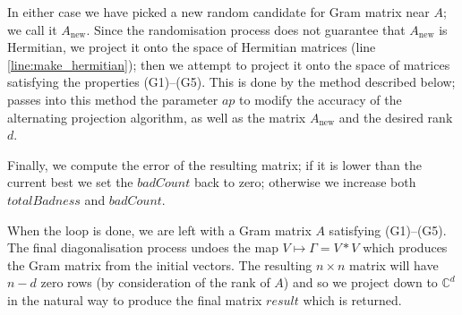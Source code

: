 \documentclass{article}
\newcommand{\C}{\mathbb{C}}
\theoremstyle{definition}
\begin{document}
  In either case we have picked a new random candidate for Gram matrix near $ A $; we call it $ A_\mathrm{new} $.
  Since the randomisation process does not guarantee that $ A_\mathrm{new} $ is Hermitian, we project it onto
  the space of Hermitian matrices (line \ref{line:make_hermitian}); then we attempt to project it onto the space
  of matrices satisfying the properties (G1)--(G5). This is done by the method 
  described below;  passes into this method the parameter $ ap $ to modify the accuracy
  of the alternating projection algorithm, as well as the matrix $ A_\mathrm{new} $ and the desired rank $ d $.

  Finally, we compute the error of the resulting matrix; if it is lower than the current best we set the $ badCount $
  back to zero; otherwise we increase both $ totalBadness $ and $ badCount $.

  When the loop is done, we are left with a Gram matrix $ A $ satisfying (G1)--(G5). The final diagonalisation process
  undoes the map $ V \mapsto \Gamma = V*V $ which produces the Gram matrix from the initial vectors. The resulting
  $ n \times n $ matrix will have $ n - d $ zero rows (by consideration of the rank of $ A $) and so we project down
  to $ \C^d $ in the natural way to produce the final matrix $ result $ which is returned.
\end{document}
